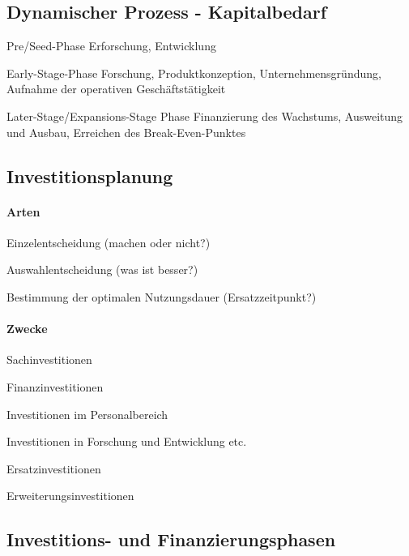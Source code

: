 \clearpage
\subsection{Dynamischer Prozess - Kapitalbedarf}
\begin{compactitem}
	\item Pre/Seed-Phase
	\subitem Erforschung, Entwicklung
	\item Early-Stage-Phase
	\subitem Forschung, Produktkonzeption, Unternehmensgründung, Aufnahme der operativen Geschäftstätigkeit
	\item Later-Stage/Expansions-Stage Phase
	\subitem Finanzierung des Wachstums, Ausweitung und Ausbau, Erreichen des Break-Even-Punktes
\end{compactitem}

\clearpage
\subsection{Investitionsplanung}
\paragraph{Arten}
\begin{compactitem}
	\item Einzelentscheidung (machen oder nicht?)
	\item Auswahlentscheidung (was ist besser?)
	\item Bestimmung der optimalen Nutzungsdauer (Ersatzzeitpunkt?)
\end{compactitem}

\paragraph{Zwecke}
\begin{compactitem}
	\item Sachinvestitionen
	\item Finanzinvestitionen
	\item Investitionen im Personalbereich
	\item Investitionen in Forschung und Entwicklung etc.
	\item Ersatzinvestitionen
	\item Erweiterungsinvestitionen
\end{compactitem}


\clearpage
\subsection{Investitions- und Finanzierungsphasen}

